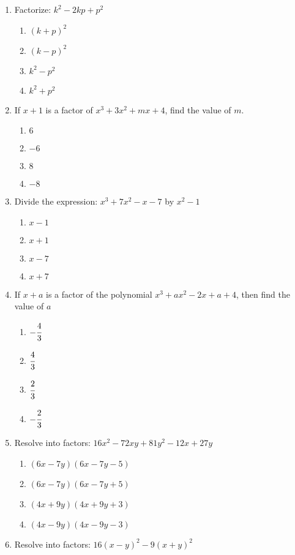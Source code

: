 \begin{multicols}{2}
\begin{enumerate}[label={\arabic*.}]
\begin{enumerate}[label={\Alph*.}]
	\end{enumerate}
\item Factorize: \(k^2 - 2kp + p^2\)
	\begin{enumerate}[label={\Alph*.}]
	\item \((k+p)^2\)
	\item \((k-p)^2\)
	\item \(k^2 - p^2\)
	\item \(k^2 + p^2\)
	\end{enumerate}
\item If $x+1$ is a factor of $x^3 + 3x^2 + mx + 4$, find the value of $m$. 
	\begin{enumerate}[label={\Alph*.}]
	\item \(6\)
	\item \(-6\)
	\item \(8\)
	\item \(-8\)
	\end{enumerate}
\item Divide the expression: $x^3 + 7x^2 -x - 7$ by $x^2-1$
	\begin{enumerate}[label={\Alph*.}]
	\item \(x-1\)
	\item \(x+1\)
	\item \(x-7\)
	\item \(x+7\)
	\end{enumerate}
\item If $x+a$ is a factor of the polynomial $x^3 +ax^2 -2x +a + 4$, then find the value of $a$
	\begin{enumerate}[label={\Alph*.}]
	\item \(-\cfrac{4}{3}\)
	\item \(\cfrac{4}{3}\)
	\item \(\cfrac{2}{3}\)
	\item \(-\cfrac{2}{3}\)
	\end{enumerate}
\item Resolve into factors: $16x^2 - 72xy + 81y^2 - 12x + 27y$
	\begin{enumerate}[label={\Alph*.}]
	\item \((6x -7y)(6x - 7y -5)\)
	\item \((6x -7y)(6x - 7y +5)\)
	\item \((4x + 9y)(4x + 9y + 3)\)
	\item \((4x - 9y)(4x - 9y - 3)\)
	\end{enumerate}
\item Resolve into factors: $16(x-y)^2 - 9(x+y)^2$
	\begin{enumerate}[label={\Alph*.}]

\end{enumerate}
\end{enumerate}
\end{multicols}

